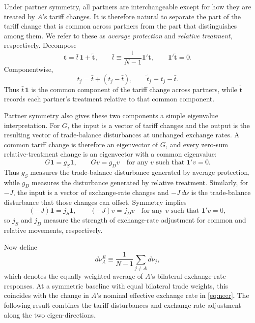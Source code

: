 \documentclass[11pt]{article}
\begin{document}
Under partner symmetry, all partners are interchangeable except for how they are treated by $A$'s tariff changes. It is therefore natural to separate the part of the tariff change that is common across partners from the part that distinguishes among them. We refer to these as \emph{average protection} and \emph{relative treatment}, respectively. Decompose
\begin{equation}
\mathbf{t}=\bar t\,\mathbf{1}+\widetilde{\mathbf{t}}, \qquad \bar t\equiv\frac{1}{N-1}\mathbf{1}'\mathbf{t}, \qquad \mathbf{1}'\widetilde{\mathbf{t}}=0.
\label{eq:t-split}
\end{equation}
Componentwise,
\begin{equation}
t_j=\bar t+(t_j-\bar t), \qquad \tilde t_j\equiv t_j-\bar t.
\end{equation}
Thus $\bar t\,\mathbf{1}$ is the common component of the tariff change across partners, while $\widetilde{\mathbf{t}}$ records each partner's treatment relative to that common component.

Partner symmetry also gives these two components a simple eigenvalue interpretation. For $G$, the input is a vector of tariff changes and the output is the resulting vector of trade-balance disturbances at unchanged exchange rates. A common tariff change is therefore an eigenvector of $G$, and every zero-sum relative-treatment change is an eigenvector with a common eigenvalue:
\[
G\mathbf{1}=g_S\mathbf{1}, \qquad Gv=g_Dv \quad \text{for any } v \text{ such that } \mathbf{1}'v=0.
\]
Thus $g_S$ measures the trade-balance disturbance generated by average protection, while $g_D$ measures the disturbance generated by relative treatment. Similarly, for $-J$, the input is a vector of exchange-rate changes and $-J\,d\boldsymbol{\nu}$ is the trade-balance disturbance that those changes can offset. Symmetry implies
\[
(-J)\mathbf{1}=j_S\mathbf{1}, \qquad (-J)v=j_Dv \quad \text{for any } v \text{ such that } \mathbf{1}'v=0,
\]
so $j_S$ and $j_D$ measure the strength of exchange-rate adjustment for common and relative movements, respectively.

Now define
\[
d\nu_A^E\equiv\frac{1}{N-1}\sum_{j\neq A}d\nu_j,
\]
which denotes the equally weighted average of $A$'s bilateral exchange-rate responses. At a symmetric baseline with equal bilateral trade weights, this coincides with the change in $A$'s nominal effective exchange rate in \eqref{eq:neer}. The following result combines the tariff disturbances and exchange-rate adjustment along the two eigen-directions.
\end{document}
